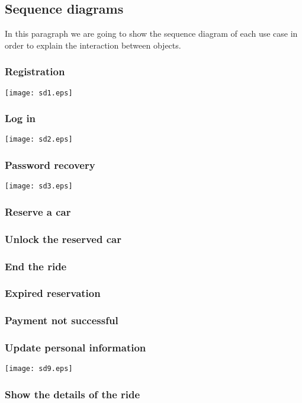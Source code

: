 \pagebreak
\subsection{Sequence diagrams}
In this paragraph we are going to show the sequence diagram of each use case in order to explain the interaction between objects.

\subsubsection{Registration}
	\centerline{
		\texttt{[image: sd1.eps]}}
	\pagebreak

\subsubsection{Log in}
	\centerline{
		\texttt{[image: sd2.eps]}}
	\pagebreak

\subsubsection{Password recovery}
	\centerline{
		\texttt{[image: sd3.eps]}}
	\pagebreak
	
\subsubsection{Reserve a car}
	
\subsubsection{Unlock the reserved car}

\subsubsection{End the ride}

\subsubsection{Expired reservation}
	
\subsubsection{Payment not successful}
	\pagebreak
	
\subsubsection{Update personal information}
	\centerline{
		\texttt{[image: sd9.eps]}}
	\pagebreak
	
\subsubsection{Show the details of the ride}
